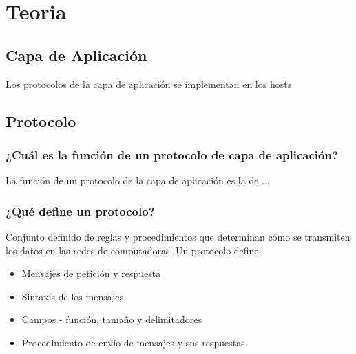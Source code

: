 \documentclass[titlepage,a4paper]{article}
\begin{document}
\section{Teoria}\label{sec:teoria}

\subsection{Capa de Aplicación}\label{sec:capaaplicacion}

Los protocolos de la capa de aplicación se implementan en los hosts


\subsection{Protocolo\label{sec:protocolo}}


\subsubsection{ ¿Cuál es la función de un protocolo de capa de aplicación?}

La función de un protocolo de la capa de aplicación es la de ...

\subsubsection{¿Qué define un protocolo?} 
Conjunto definido de reglas y procedimientos que determinan cómo se transmiten los datos en las redes de computadoras. Un protocolo define:

\begin{itemize}
    \item Mensajes de petición y respuesta
    \item Sintaxis de los mensajes
    \item Campos - función, tamaño y delimitadores
    \item Procedimiento de envío de mensajes y sus respuestas
\end{itemize}
\end{document}
